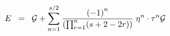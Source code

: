\begin{equation}
E \;\; = \;\; {\cal{G}} + \sum_{n=1}^{s/2} { {(-1)}^n \over \left( \prod_{r=1}^{n} (s+2-2r) \right)} \; \eta^n \cdot \tau^{n} {\cal{G}}
\label{eq:x18}
\end{equation}

